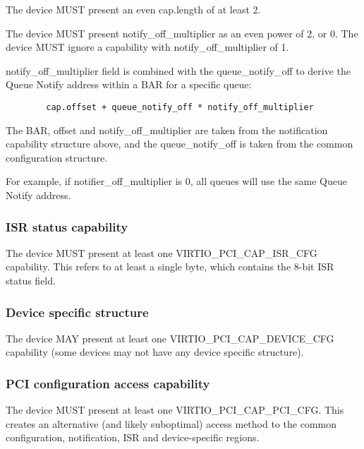 The device MUST present an even cap.length of at least 2.

The device MUST present notify_off_multiplier as an even power of 2,
or 0.  The device MUST ignore a capability with notify_off_multiplier
of 1.

notify_off_multiplier field is combined with the queue_notify_off to
derive the Queue Notify address within a BAR for a specific queue:

\begin{lstlisting}
        cap.offset + queue_notify_off * notify_off_multiplier
\end{lstlisting}

The BAR, offset and notify_off_multiplier are taken from the
notification capability structure above, and the queue_notify_off is
taken from the common configuration structure.

For example, if notifier_off_multiplier is 0, all queues will use the same 
Queue Notify address.

\subsubsection{ISR status capability}\label{sec:Virtio Transport Options / Virtio Over PCI Bus / PCI Device Layout / ISR status capability}

The device MUST present at least one VIRTIO_PCI_CAP_ISR_CFG capability.  This
refers to at least a single byte, which contains the 8-bit ISR status field.

\subsubsection{Device specific structure}\label{sec:Virtio Transport Options / Virtio Over PCI Bus / PCI Device Layout / Device specific structure}

The device MAY present at least one VIRTIO_PCI_CAP_DEVICE_CFG capability (some
devices may not have any device specific structure).

\subsubsection{PCI configuration access capability}\label{sec:Virtio Transport Options / Virtio Over PCI Bus / PCI Device Layout / PCI configuration access capability}

The device MUST present at least one VIRTIO_PCI_CAP_PCI_CFG.  This
creates an alternative (and likely suboptimal) access method to the
common configuration, notification, ISR and device-specific regions.

